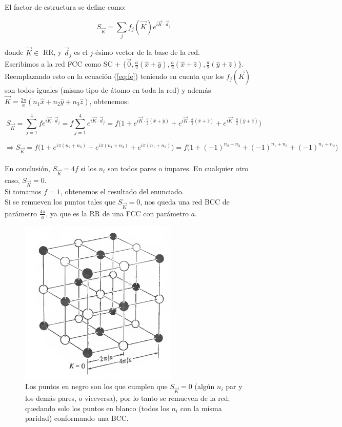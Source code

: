 \documentclass[a4paper]{article}
\begin{document}
\subsection{}

El factor de estructura se define como:

\begin{equation}
\label{eq:fe}
S_{\vec{K}} = \sum_{j} f_{j}(\vec{K})e^{i\vec{K} \cdot \vec{d}_{j}}
\end{equation}

donde $\vec{K} \in$ RR, y $\vec{d}_{j}$ es el $j$-\'esimo vector de la base de la red.\\

Escribimos a la red FCC como SC + $\{{\vec{0}, \frac{a}{2}(\hat{x} + \hat{y}), \frac{a}{2}(\hat{x} + \hat{z}), \frac{a}{2}(\hat{y} + \hat{z})}\}$. Reemplazando esto en la ecuaci\'on (\ref{eq:fe}) teniendo en cuenta que los $f_{j}(\vec{K})$ son todos iguales (mismo tipo de \'atomo en toda la red) y adem\'as $\vec{K} = \frac{2\pi}{a}(n_{1}\hat{x} + n_{2}\hat{y} + n_{3}\hat{z})$, obtenemos:

$$S_{\vec{K}} = \sum_{j = 1}^{4} fe^{i\vec{K} \cdot \vec{d}_{j}} = f\sum_{j = 1}^{4} e^{i\vec{K} \cdot \vec{d}_{j}} = f\bigg(1 + e^{i\vec{K} \cdot \frac{a}{2}(\hat{x} + \hat{y})} + e^{i\vec{K} \cdot \frac{a}{2}(\hat{x} + \hat{z})} + e^{i\vec{K} \cdot \frac{a}{2}(\hat{y} + \hat{z})}\bigg)$$

$$\Rightarrow S_{\vec{K}} = f\bigg(1 + e^{i\pi(n_{2} + n_{3})} + e^{i\pi(n_{1} + n_{3})} + e^{i\pi(n_{1} + n_{2})}\bigg) = f\bigg(1 + (-1)^{n_{2} + n_{3}} + (-1)^{n_{1} + n_{3}} + (-1)^{n_{1} + n_{2}}\bigg)$$
\\

En conclusi\'on, $S_{\vec{K}} = 4f$ si los $n_{i}$ son todos pares o impares. En cualquier otro caso, $S_{\vec{K}} = 0$.\\

Si tomamos $f = 1$, obtenemos el resultado del enunciado.\\

Si se remueven los puntos tales que $S_{\vec{K}} = 0$, nos queda una red BCC de par\'ametro $\frac{4\pi}{a}$, ya que es la RR de una FCC con par\'ametro $a$.

\begin{figure}[H]
  \centering
  \includegraphics[width=0.3\linewidth,height=0.3\linewidth]{sk.png}
  \caption{Los puntos en negro son los que cumplen que $S_{\vec{K}} = 0$ (alg\'un $n_{i}$ par y los dem\'as pares, o viceversa), por lo tanto se remueven de la red; quedando solo los puntos en blanco (todos los $n_{i}$ con la misma paridad) conformando una BCC.}
  \label{fig:sk}
\end{figure}
\end{document}
